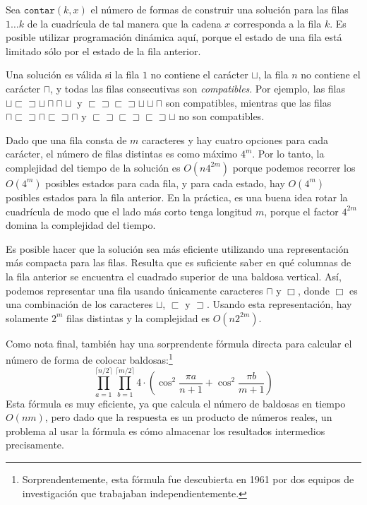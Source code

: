 Sea $\texttt{contar}(k,x)$ el número de formas de
construir una solución para las filas $1 \ldots k$
de la cuadrícula de tal manera que la cadena $x$ corresponda a la fila $k$.
Es posible utilizar programación dinámica aquí,
porque el estado de una fila está limitado
sólo por el estado de la fila anterior.

Una solución es válida si la fila $1$ no contiene
el carácter $\sqcup$,
la fila $n$ no contiene el carácter $\sqcap$,
y todas las filas consecutivas son \emph{compatibles}.
Por ejemplo, las filas
$\sqcup \sqsubset \sqsupset \sqcup \sqcap \sqcap \sqcup$ y
$\sqsubset \sqsupset \sqsubset \sqsupset \sqcup \sqcup \sqcap$
son compatibles, mientras que las filas
$\sqcap \sqsubset \sqsupset \sqcap \sqsubset \sqsupset \sqcap$ y
$\sqsubset \sqsupset \sqsubset \sqsupset \sqsubset \sqsupset \sqcup$
no son compatibles.

Dado que una fila consta de $m$ caracteres y hay
cuatro opciones para cada carácter, el número de filas distintas
es como máximo $4^m$.
Por lo tanto, la complejidad del tiempo de la solución es
$O(n 4^{2m})$ porque podemos recorrer los
$O(4^m)$ posibles estados para cada fila,
y para cada estado, hay $O(4^m)$
posibles estados para la fila anterior.
En la práctica, es una buena idea rotar la cuadrícula
de modo que el lado más corto tenga longitud $m$,
porque el factor $4^{2m}$ domina la complejidad del tiempo.

Es posible hacer que la solución sea más eficiente
utilizando una representación más compacta para las filas.
Resulta que es suficiente saber en qué
columnas de la fila anterior se encuentra el cuadrado superior
de una baldosa vertical.
Así, podemos representar una fila usando únicamente caracteres
$\sqcap$ y $\Box$, donde $\Box$ es una combinación
de los caracteres
$\sqcup$, $\sqsubset$ y $\sqsupset$.
Usando esta representación, hay solamente
$2^m$ filas distintas y la complejidad es $O(n 2^{2m})$.

Como nota final, también hay una sorprendente fórmula directa
para calcular el número de forma de colocar baldosas:\footnote{Sorprendentemente,
    esta fórmula fue descubierta en 1961 por dos equipos de investigación \cite{kas61,tem61}
    que trabajaban independientemente.}
\[ \prod_{a=1}^{\lceil n/2 \rceil} \prod_{b=1}^{\lceil m/2 \rceil} 4 \cdot (\cos^2 \frac{\pi a}{n + 1} + \cos^2 \frac{\pi b}{m+1})\]
Esta fórmula es muy eficiente, ya que calcula
el número de baldosas en tiempo $O(nm)$,
pero dado que la respuesta es un producto de números reales,
un problema al usar la fórmula es
cómo almacenar los resultados intermedios precisamente.


